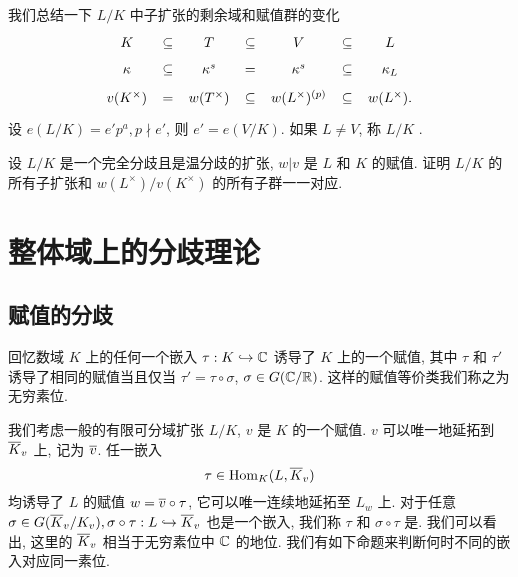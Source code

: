 我们总结一下 $L/K$ 中子扩张的剩余域和赋值群的变化
  \[\xymatrix@=5pt{
K &\subseteq & T&\subseteq & V&\subseteq & L\\
\kappa&\subseteq & \kappa^s&=& \kappa^s&\subseteq &\kappa_L\\
v(K^\times)&= & w(T^\times)&\subseteq & w(L^\times)^{(p)}&\subseteq& w(L^\times).
}\]
设 $e(L/K)=e'p^a,p\nmid e'$, 则 $e'=e(V/K)$. 如果 $L\neq V$, 称 $L/K$ .

\begin{exercise}
设 $L/K$ 是一个完全分歧且是温分歧的扩张, $w|v$ 是 $L$ 和 $K$ 的赋值. 证明 $L/K$ 的所有子扩张和 $w(L^\times)/v(K^\times)$ 的所有子群一一对应.
\end{exercise}

\section{整体域上的分歧理论}
\label{sec:global ramification theory}
\subsection{赋值的分歧}
回忆数域 $K$ 上的任何一个嵌入 $\tau:K\hookrightarrow{\mathbb{C}}$ 诱导了 $K$ 上的一个赋值, 其中 $\tau$ 和 $\tau'$ 诱导了相同的赋值当且仅当 $\tau'=\tau\circ \sigma$, $\sigma\in G({\mathbb{C}}/{\mathbb{R}})$. 这样的赋值等价类我们称之为无穷素位.

我们考虑一般的有限可分域扩张 $L/K$, $v$ 是 $K$ 的一个赋值. $v$ 可以唯一地延拓到 $\overline K_v$ 上, 记为 $\overline v$. 任一嵌入
  \[\tau\in{\mathrm{Hom}}_K(L,\overline K_v)\]
均诱导了 $L$ 的赋值 $w=\overline v\circ \tau$, 它可以唯一连续地延拓至 $L_w$ 上.
对于任意 $\sigma\in G(\overline K_v/K_v),\sigma\circ \tau:L\hookrightarrow \overline K_v$ 也是一个嵌入, 我们称 $\tau$ 和 $\sigma\circ \tau$ 是. 我们可以看出, 这里的 $\overline K_v$ 相当于无穷素位中 ${\mathbb{C}}$ 的地位. 我们有如下命题来判断何时不同的嵌入对应同一素位.

